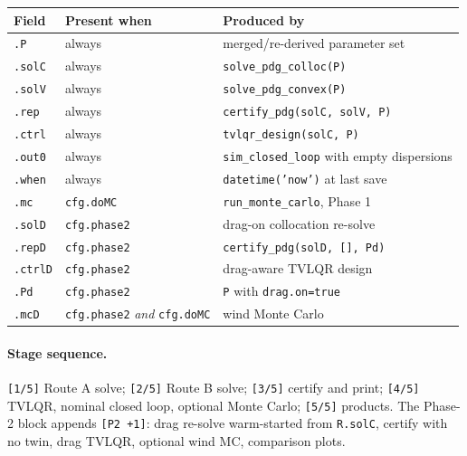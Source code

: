 \documentclass[11pt]{article}
\begin{document}
\begin{center}
\begin{tabular}{@{}lll@{}}
\toprule
Field & Present when & Produced by \\
\midrule
\texttt{.P}     & always & merged/re-derived parameter set \\
\texttt{.solC}  & always & \texttt{solve\_pdg\_colloc(P)} \\
\texttt{.solV}  & always & \texttt{solve\_pdg\_convex(P)} \\
\texttt{.rep}   & always & \texttt{certify\_pdg(solC, solV, P)} \\
\texttt{.ctrl}  & always & \texttt{tvlqr\_design(solC, P)} \\
\texttt{.out0}  & always & \texttt{sim\_closed\_loop} with empty dispersions \\
\texttt{.when}  & always & \texttt{datetime('now')} at last save \\
\texttt{.mc}    & \texttt{cfg.doMC} & \texttt{run\_monte\_carlo}, Phase 1 \\
\texttt{.solD}  & \texttt{cfg.phase2} & drag-on collocation re-solve \\
\texttt{.repD}  & \texttt{cfg.phase2} & \texttt{certify\_pdg(solD, [], Pd)} \\
\texttt{.ctrlD} & \texttt{cfg.phase2} & drag-aware TVLQR design \\
\texttt{.Pd}    & \texttt{cfg.phase2} & \texttt{P} with \texttt{drag.on=true} \\
\texttt{.mcD}   & \texttt{cfg.phase2} \emph{and} \texttt{cfg.doMC} &
  wind Monte Carlo \\
\bottomrule
\end{tabular}
\end{center}

\paragraph{Stage sequence.} \texttt{[1/5]} Route A solve; \texttt{[2/5]}
Route B solve; \texttt{[3/5]} certify and print; \texttt{[4/5]} TVLQR,
nominal closed loop, optional Monte Carlo; \texttt{[5/5]} products. The
Phase-2 block appends \texttt{[P2 +1]}: drag re-solve warm-started from
\texttt{R.solC}, certify with no twin, drag TVLQR, optional wind MC,
comparison plots.
\end{document}
